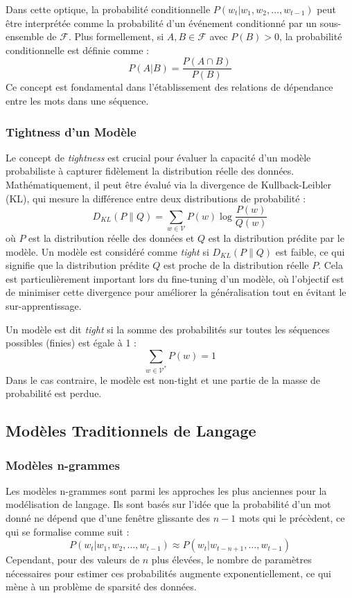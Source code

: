\documentclass[13pt,a4paper]{article}
\begin{document}
Dans cette optique, la probabilité conditionnelle $P(w_t | w_1, w_2, \dots, w_{t-1})$ peut être interprétée comme la probabilité d'un événement conditionné par un sous-ensemble de $\mathcal{F}$. Plus formellement, si $A, B \in \mathcal{F}$ avec $P(B) > 0$, la probabilité conditionnelle est définie comme :
\[
P(A|B) = \frac{P(A \cap B)}{P(B)}
\]
Ce concept est fondamental dans l'établissement des relations de dépendance entre les mots dans une séquence.

\subsubsection{Tightness d'un Modèle}
Le concept de \textit{tightness} est crucial pour évaluer la capacité d'un modèle probabiliste à capturer fidèlement la distribution réelle des données. Mathématiquement, il peut être évalué via la divergence de Kullback-Leibler (KL), qui mesure la différence entre deux distributions de probabilité :
\[
D_{KL}(P \| Q) = \sum_{w \in \mathcal{V}} P(w) \log \frac{P(w)}{Q(w)}
\]
où $P$ est la distribution réelle des données et $Q$ est la distribution prédite par le modèle. Un modèle est considéré comme \textit{tight} si $D_{KL}(P \| Q)$ est faible, ce qui signifie que la distribution prédite $Q$ est proche de la distribution réelle $P$. Cela est particulièrement important lors du fine-tuning d'un modèle, où l'objectif est de minimiser cette divergence pour améliorer la généralisation tout en évitant le sur-apprentissage.

Un modèle est dit \textit{tight} si la somme des probabilités sur toutes les séquences possibles (finies) est égale à 1 :
\[
\sum_{w \in \mathcal{V}^*} P(w) = 1
\]
Dans le cas contraire, le modèle est non-tight et une partie de la masse de probabilité est perdue.

\subsection{Modèles Traditionnels de Langage}

\subsubsection{Modèles n-grammes}
Les modèles n-grammes sont parmi les approches les plus anciennes pour la modélisation de langage. Ils sont basés sur l'idée que la probabilité d'un mot donné ne dépend que d'une fenêtre glissante des $n-1$ mots qui le précèdent, ce qui se formalise comme suit :
\[
P(w_t | w_1, w_2, \dots, w_{t-1}) \approx P(w_t | w_{t-n+1}, \dots, w_{t-1})
\]
Cependant, pour des valeurs de $n$ plus élevées, le nombre de paramètres nécessaires pour estimer ces probabilités augmente exponentiellement, ce qui mène à un problème de sparsité des données. 
\end{document}
